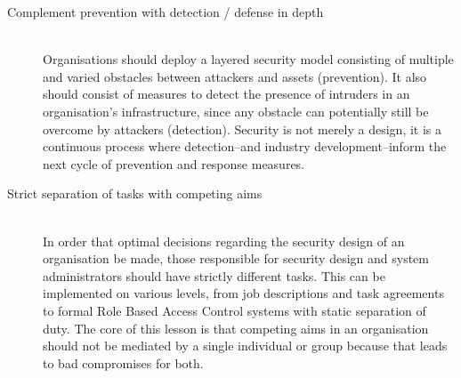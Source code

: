 \documentclass[a4paper]{llncs}
\begin{document}
\begin{description}
  \item[Complement prevention with detection / defense in depth] \hfill \\
Organisations should deploy a layered security model consisting of multiple and varied obstacles between attackers and assets (prevention). It also should consist of measures to detect the presence of intruders in an organisation’s infrastructure, since any obstacle can potentially still be overcome by attackers (detection). Security is not merely a design, it is a continuous process where detection--and industry development--inform the next cycle of prevention and response measures.
  \item[Strict separation of tasks with competing aims] \hfill \\
In order that optimal decisions regarding the security design of an organisation be made, those responsible for security design and system administrators should have strictly different tasks. This can be implemented on various levels, from job descriptions and task agreements to formal Role Based Access Control systems with static separation of duty. The core of this lesson is that competing aims in an organisation should not be mediated by a single individual or group because that leads to bad compromises for both.
\end{description}
\end{document}
